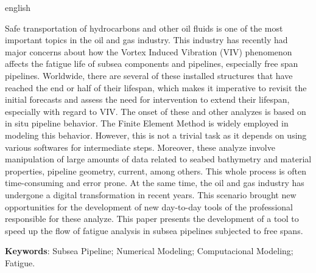 \begin{resumo}[Abstract]
    \begin{otherlanguage*}{english}
    
        Safe transportation of hydrocarbons and other oil fluids is one of the most important topics in the oil and gas industry.
        This industry has recently had major concerns about how the Vortex Induced Vibration (VIV) phenomenon affects the fatigue life of subsea components and pipelines, especially free span pipelines.
        Worldwide, there are several of these installed structures that have reached the end or half of their lifespan, which makes it imperative to revisit the initial forecasts and assess the need for intervention to extend their lifespan, especially with regard to VIV.
        The onset of these and other analyzes is based on in situ pipeline behavior.
        The Finite Element Method is widely employed in modeling this behavior.
        However, this is not a trivial task as it depends on using various softwares for intermediate steps.
        Moreover, these analyze involve manipulation of large amounts of data related to seabed bathymetry and material properties, pipeline geometry, current, among others.
        This whole process is often time-consuming and error prone.
        At the same time, the oil and gas industry has undergone a digital transformation in recent years.
        This scenario brought new opportunities for the development of new day-to-day tools of the professional responsible for these analyze.
        This paper presents the development of a tool to speed up the flow of fatigue analysis in subsea pipelines subjected to free spans.

    \vspace{\onelineskip}

    \noindent
    \textbf{Keywords}: Subsea Pipeline; Numerical Modeling; Computacional Modeling; Fatigue.
    \end{otherlanguage*}
\end{resumo}